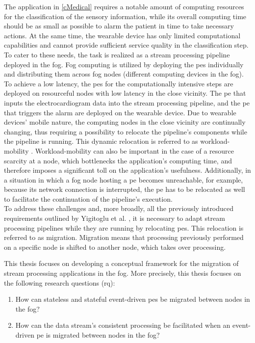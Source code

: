 The application in \ref{cMedical} requires a notable amount of computing resources for the classification of the sensory information, while its overall computing time should be as small as possible to alarm the patient in time to take necessary actions. At the same time, the wearable device has only limited computational capabilities and cannot provide sufficient service quality in the classification step. To cater to these needs, the task is realized as a stream processing pipeline deployed in the fog. Fog computing is utilized by deploying the \gls{pe}s individually and distributing them across fog nodes (different computing devices in the fog). To achieve a low latency, the \gls{pe}s for the computationally intensive steps are deployed on resourceful nodes with low latency in the close vicinity. The \gls{pe} that inputs the electrocardiogram data into the stream processing pipeline, and the \gls{pe} that triggers the alarm are deployed on the wearable device. Due to wearable devices' mobile nature, the computing nodes in the close vicinity are continually changing, thus requiring a possibility to relocate the pipeline's components while the pipeline is running. This dynamic relocation is referred to as workload-mobility \cite{Yigitoglu.2017}. Workload-mobility can also be important in the case of a resource scarcity at a node, which bottlenecks the application's computing time, and therefore imposes a significant toll on the application's usefulness. Additionally, in a situation in which a fog node hosting a \gls{pe} becomes unreachable, for example, because its network connection is interrupted, the \gls{pe} has to be relocated as well to facilitate the continuation of the pipeline's execution.\\
To address these challenges and, more broadly, all the previously introduced requirements outlined by Yigitoglu et al. \cite{Yigitoglu.2017}, it is necessary to adapt stream processing pipelines while they are running by relocating \gls{pe}s. This relocation is referred to as migration. Migration means that processing  previously performed on a specific node is shifted to another node, which takes over processing.\par
This thesis focuses on developing a conceptual framework for the migration of stream processing applications in the fog. More precisely, this thesis focuses on the following research questions (\acrshort{rq}):

\begin{enumerate}[label=RQ\arabic* , wide=0.5em,  leftmargin=*]
    \item \label{rqMigration} How can stateless and stateful event-driven \gls{pe}s be migrated between nodes in the fog?
    \item \label{rqConsistency} How can the data stream's consistent processing be facilitated when an event-driven \gls{pe} is migrated between nodes in the fog?
\end{enumerate}

